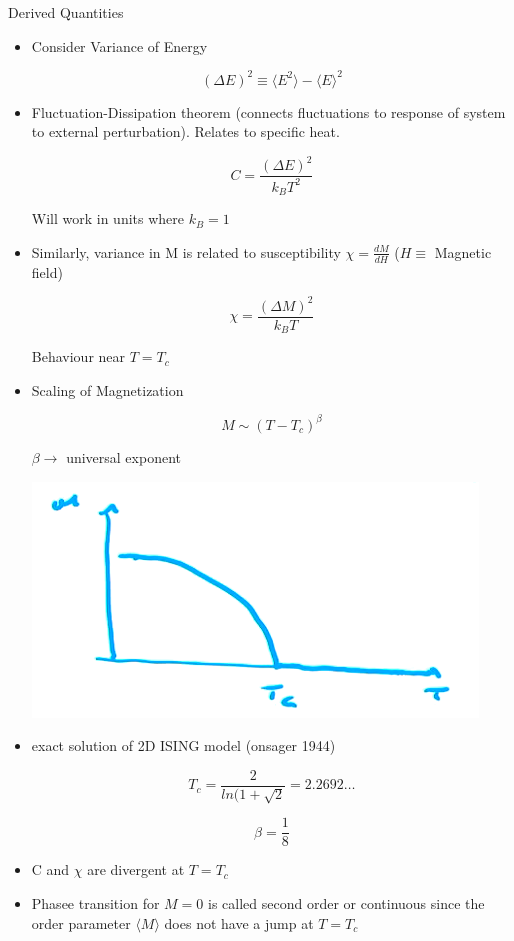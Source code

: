 Derived Quantities
\begin{itemize}
    \item Consider Variance of Energy

    \[ (\Delta E ) ^2 \equiv \langle E^2 \rangle - \langle E \rangle^2\]

    \item Fluctuation-Dissipation theorem (connects fluctuations to response of system to external perturbation). Relates to specific heat.

    \[ C = \frac{(\Delta E)^2}{k_B T^2}\]

    Will work in units where $k_B=1$

    \item Similarly, variance in M is related to susceptibility $\chi = \frac{dM}{dH}$ ($H\equiv$ Magnetic field)

    \[ \chi = \frac{(\Delta M)^2}{k_B T}\]

    Behaviour near $T=T_c$

    \item Scaling of Magnetization

    \[ M \sim (T-T_c)^{\beta}\]

    $\beta \rightarrow$ universal exponent

    \begin{center}
        \includegraphics[width = 0.5\linewidth]{Images/ising_phase_transition.png}
    \end{center}

    \item exact solution of 2D ISING model (onsager 1944)

    \[ T_c = \frac{2}{ln(1+\sqrt{2}} = 2.2692 \ldots \]

    \[ \beta = \frac{1}{8}\]

    \item C and $\chi$ are divergent at $T=T_c$

    \item Phasee transition for $M=0$ is called second order or continuous since the order parameter $\langle M \rangle$ does not have a jump at $T=T_c$
    
\end{itemize}

